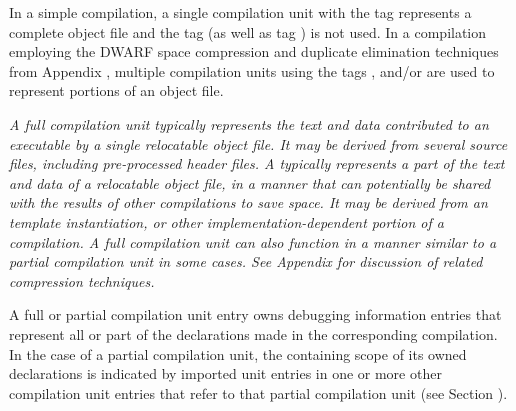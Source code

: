 In a simple compilation, a single compilation unit with
the tag 
\DWTAGcompileunit{} represents a complete object file
and the tag 
\DWTAGpartialunit{} (as well as tag \DWTAGtypeunit) is not used. 
In a compilation
employing the DWARF space compression and duplicate elimination
techniques from 
Appendix , 
multiple compilation units using
the tags 
\DWTAGcompileunit{}, 
\DWTAGpartialunit{} and/or 
\DWTAGtypeunit{} 
are used to represent portions of an object file.

\textit{A full compilation unit typically represents the text and
data contributed to an executable by a single relocatable
object file. It may be derived from several source files,
including pre-processed header files. 
A  typically represents a part 
of the text and data of a relocatable object file, in a manner that 
can potentially be shared with the results of other compilations
to save space. It may be derived from an 
template instantiation, or other implementation-dependent
portion of a compilation. A full compilation unit can also
function in a manner similar to a partial compilation unit
in some cases.
See Appendix 
for discussion of related compression techniques.}

A full or partial 
compilation unit entry owns debugging information
entries that represent all or part of the declarations
made in the corresponding compilation. In the case of a
partial compilation unit, the containing scope of its owned
declarations is indicated by imported unit entries in one
or more other compilation unit entries that refer to that
partial compilation unit (see 
Section ).

